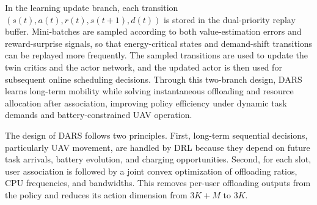 \documentclass[journal]{IEEEtran}
\begin{document}
In the learning update branch, each transition $(s(t),a(t),r(t),s(t+1),d(t))$ is stored in the dual-priority replay buffer. Mini-batches are sampled according to both value-estimation errors and reward-surprise signals, so that energy-critical states and demand-shift transitions can be replayed more frequently. The sampled transitions are used to update the twin critics and the actor network, and the updated actor is then used for subsequent online scheduling decisions. Through this two-branch design, DARS learns long-term mobility while solving instantaneous offloading and resource allocation after association, improving policy efficiency under dynamic task demands and battery-constrained UAV operation.


The design of DARS follows two principles. First, long-term sequential
decisions, particularly UAV movement, are handled by DRL because they depend
on future task arrivals, battery evolution, and charging opportunities.
Second, for each slot, user association is followed by a joint convex
optimization of offloading ratios, CPU frequencies, and bandwidths. This
removes per-user offloading outputs from the policy and reduces its action
dimension from $3K+M$ to $3K$.

\end{document}
